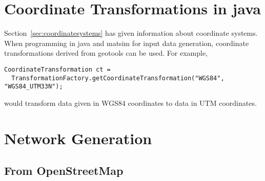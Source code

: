 \section{Coordinate Transformations in \gls{java}}
\label{sec:programming-coordinate-systems}
Section~\ref{sec:coordinatesystems} has 
given 
information about coordinate systems.   
When 
programming in \gls{java} and \gls{matsim} for input data 
generation, coordinate transformations derived from geotools \citep{geotools-www-page} can be used.  For example, 
\begin{lstlisting}
CoordinateTransformation ct = 
  TransformationFactory.getCoordinateTransformation("WGS84", "WGS84_UTM33N");
\end{lstlisting}
would transform data given in WGS84 coordinates to data in UTM coordinates.

\section{Network Generation}

\subsection{From OpenStreetMap}
\label{sec:network-from-osm}

